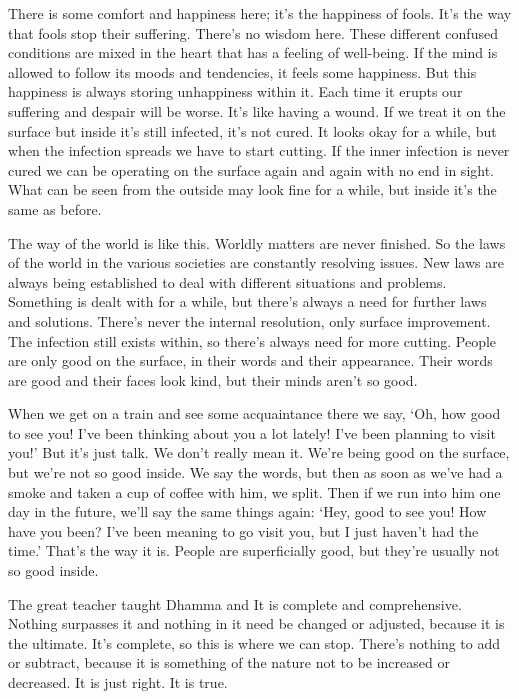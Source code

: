 There is some comfort and happiness here; it's the happiness of fools. It's the way that fools stop their suffering. There's no wisdom here. These different confused conditions are mixed in the heart that has a feeling of well-being. If the mind is allowed to follow its moods and tendencies, it feels some happiness. But this happiness is always storing unhappiness within it. Each time it erupts our suffering and despair will be worse. It's like having a wound. If we treat it on the surface but inside it's still infected, it's not cured. It looks okay for a while, but when the infection spreads we have to start cutting. If the inner infection is never cured we can be operating on the surface again and again with no end in sight. What can be seen from the outside may look fine for a while, but inside it's the same as before.

The way of the world is like this. Worldly matters are never finished. So the laws of the world in the various societies are constantly resolving issues. New laws are always being established to deal with different situations and problems. Something is dealt with for a while, but there's always a need for further laws and solutions. There's never the internal resolution, only surface improvement. The infection still exists within, so there's always need for more cutting. People are only good on the surface, in their words and their appearance. Their words are good and their faces look kind, but their minds aren't so good.

When we get on a train and see some acquaintance there we say, `Oh, how good to see you! I've been thinking about you a lot lately! I've been planning to visit you!' But it's just talk. We don't really mean it. We're being good on the surface, but we're not so good inside. We say the words, but then as soon as we've had a smoke and taken a cup of coffee with him, we split. Then if we run into him one day in the future, we'll say the same things again: `Hey, good to see you! How have you been? I've been meaning to go visit you, but I just haven't had the time.' That's the way it is. People are superficially good, but they're usually not so good inside.

The great teacher taught Dhamma and  It is complete and comprehensive. Nothing surpasses it and nothing in it need be changed or adjusted, because it is the ultimate. It's complete, so this is where we can stop. There's nothing to add or subtract, because it is something of the nature not to be increased or decreased. It is just right. It is true.

